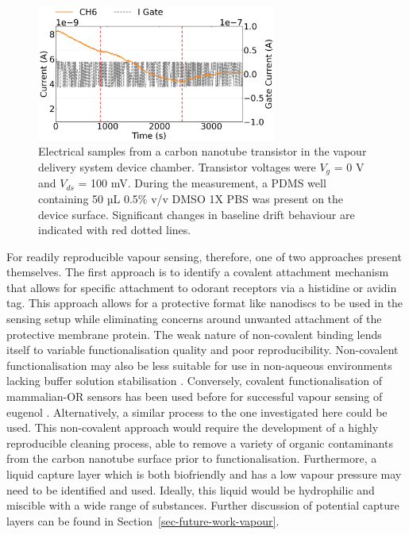 \documentclass[
  a4paper,
]{scrbook}
\begin{document}
\begin{figure}

{\centering \includegraphics[width=0.7\textwidth,height=\textheight]{figures/ch9/Q39C11.png}

}

\caption[Electrical samples from a carbon nanotube transistor in the
vapour delivery system device chamber, where 50 µL 0.5\% v/v DMSO 1X PBS
was present on the device surface.]{\label{fig-buffer-vapour}Electrical
samples from a carbon nanotube transistor in the vapour delivery system
device chamber. Transistor voltages were \(V_{g}\) = 0 V and \(V_{ds}\)
= 100 mV. During the measurement, a PDMS well containing 50 µL 0.5\% v/v
DMSO 1X PBS was present on the device surface. Significant changes in
baseline drift behaviour are indicated with red dotted lines.}

\end{figure}

For readily reproducible vapour sensing, therefore, one of two
approaches present themselves. The first approach is to identify a
covalent attachment mechanism that allows for specific attachment to
odorant receptors via a histidine or avidin tag. This approach allows
for a protective format like nanodiscs to be used in the sensing setup
while eliminating concerns around unwanted attachment of the protective
membrane protein. The weak nature of non-covalent binding lends itself
to variable functionalisation quality and poor reproducibility.
Non-covalent functionalisation may also be less suitable for use in
non-aqueous environments lacking buffer solution stabilisation
\autocite{Li2023}. Conversely, covalent functionalisation of
mammalian-OR sensors has been used before for successful vapour sensing
of eugenol \autocite{Goldsmith2011}. Alternatively, a similar process to
the one investigated here could be used. This non-covalent approach
would require the development of a highly reproducible cleaning process,
able to remove a variety of organic contaminants from the carbon
nanotube surface prior to functionalisation. Furthermore, a liquid
capture layer which is both biofriendly and has a low vapour pressure
may need to be identified and used. Ideally, this liquid would be
hydrophilic and miscible with a wide range of substances. Further
discussion of potential capture layers can be found in
Section~\ref{sec-future-work-vapour}.
\end{document}
